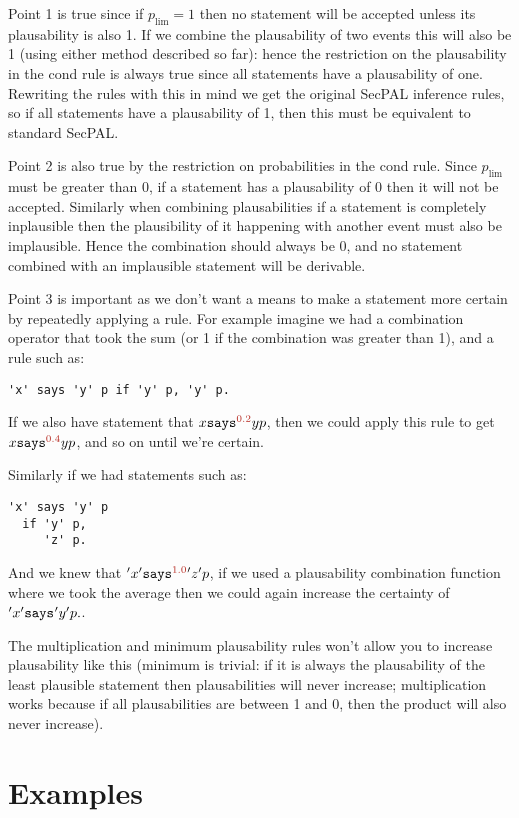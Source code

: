 \documentclass[a4paper]{article}
\newcommand{\new}[1]{{\color{BrickRed} #1}}
\newcommand{\secpalmath}[1]{\ensuremath\texttt{#1}}
\newcommand{\says}[1]{\secpalmath{says}^{\new{#1}}}
\begin{document}
Point 1 is true since if $p_{\text{lim}} = 1$ then no statement will be accepted unless its plausability is also 1.
If we combine the plausability of two events this will also be 1 (using either method described so far):
    hence the restriction on the plausability in the cond rule is always true since all statements have a plausability of one.
Rewriting the rules with this in mind we get the original SecPAL inference rules, so if all statements have a plausability of 1, then this must be equivalent to standard SecPAL.

Point 2 is also true by the restriction on probabilities in the cond rule.
Since $p_{\text{lim}}$ must be greater than 0, if a statement has a plausability of 0 then it will not be accepted.
Similarly when combining plausabilities if a statement is completely inplausible then the plausibility of it happening with another event must also be implausible.
Hence the combination should always be 0, and no statement combined with an implausible statement will be derivable.

Point 3 is important as we don't want a means to make a statement more certain
by repeatedly applying a rule.  For example imagine we had a combination
operator that took the sum (or 1 if the combination was greater than 1), and a
rule such as:
\begin{lstlisting} 
'x' says 'y' p if 'y' p, 'y' p.
\end{lstlisting}
If we also have statement that $x \says{0.2} y p$, then we
could apply this rule to get $x \says{0.4} y p$, and so on until we're certain.

Similarly if we had statements  such as:
\begin{lstlisting} 
'x' says 'y' p 
  if 'y' p,
     'z' p.
\end{lstlisting}
And we knew that $'x'\says{1.0}{} 'z' p$, if we used a plausability combination function where we took the average then we could again increase the certainty of $'x'\says{}{} 'y' p.$.

The multiplication and minimum plausability rules won't allow you to increase plausability like this (minimum is trivial: if it is always the plausability of the least plausible statement then plausabilities will never increase; multiplication works because if all plausabilities are between 1 and 0, then the product will also never increase).

\section{Examples}
\end{document}
